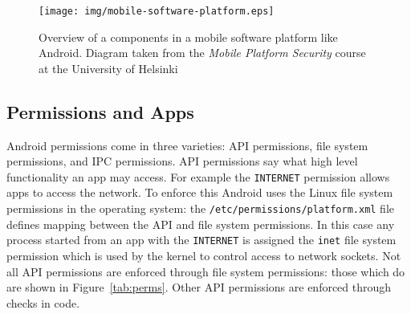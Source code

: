 \documentclass[a4paper]{article}
\begin{document}
\begin{figure}
  \centering
  \texttt{[image: img/mobile-software-platform.eps]}
  \caption{Overview of a components in a mobile software platform like Android.
    Diagram taken from the \emph{Mobile Platform Security} course at the
  University of Helsinki}%
  \label{fig:mobilesoftwareplatform}
\end{figure}

\subsection{Permissions and Apps}


Android permissions come in three varieties: API permissions, file system
permissions, and IPC permissions.  API permissions say what high level
functionality an app may access.  For example the \texttt{INTERNET} permission
allows apps to access the network.  To enforce this Android uses the
Linux file system permissions in the operating system: the
\texttt{/etc/permissions/platform.xml} file defines mapping between the API
and file system permissions.  In this case any process started from an app with
the \texttt{INTERNET} is assigned the \texttt{inet} file system permission which
is used by the kernel to control access to network sockets.  Not all API
permissions are enforced through file system permissions: those which do are
shown in Figure~\ref{tab:perms}.  Other API permissions are enforced through
checks in code.  
\end{document}
